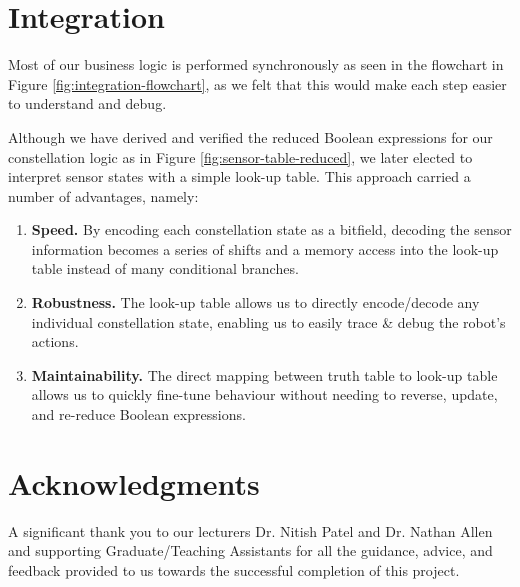 \documentclass[conference]{IEEEtran}
\begin{document}
\section{Integration}

Most of our business logic is performed synchronously as seen in the flowchart in Figure \ref{fig:integration-flowchart}, as we felt that this would make each step easier to understand and debug.

Although we have derived and verified the reduced Boolean expressions for our constellation logic as in Figure \ref{fig:sensor-table-reduced}, we later elected to interpret sensor states with a simple look-up table.
This approach carried a number of advantages, namely:
\begin{enumerate}
	\item \textbf{Speed.} By encoding each constellation state as a bitfield, decoding the sensor information becomes a series of shifts and a memory access into the look-up table instead of many conditional branches.
	\item \textbf{Robustness.} The look-up table allows us to directly encode/decode any individual constellation state, enabling us to easily trace \& debug the robot's actions.
	\item \textbf{Maintainability.} The direct mapping between truth table to look-up table allows us to quickly fine-tune behaviour without needing to reverse, update, and re-reduce Boolean expressions.
\end{enumerate}



\section*{Acknowledgments}

A significant thank you to our lecturers Dr. Nitish Patel and Dr. Nathan Allen and supporting Graduate/Teaching Assistants for all the guidance, advice, and feedback provided to us towards the successful completion of this project.




\nocite{*}





\appendix
\end{document}
